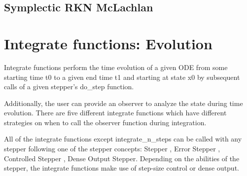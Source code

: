 \subsection{Symplectic RKN McLachlan}
\label{Symplectic RKN McLachlan}

\lipsum[2]


\section{Integrate functions: Evolution}
\label{EvolutionODE}

Integrate functions perform the time evolution of a given ODE from some starting time t0 to a given end time t1 and starting at state x0 by subsequent calls of a given stepper's do\_step function. 

Additionally, the user can provide an observer to analyze the state during time evolution. There are five different integrate functions which have different strategies on when to call the observer function during integration. 

All of the integrate functions except integrate\_n\_steps can be called with any stepper following one of the stepper concepts: Stepper , Error Stepper , Controlled Stepper , Dense Output Stepper. Depending on the abilities of the stepper, the integrate functions make use of step-size control or dense output. 




